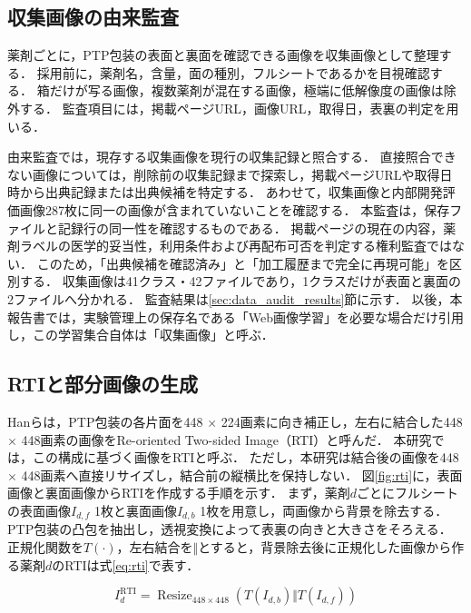 \documentclass[uplatex,dvipdfmx]{jsarticle}
\begin{document}
\subsection{収集画像の由来監査}\label{sec:provenance_audit}

薬剤ごとに，PTP包装の表面と裏面を確認できる画像を収集画像として整理する．
採用前に，薬剤名，含量，面の種別，フルシートであるかを目視確認する．
箱だけが写る画像，複数薬剤が混在する画像，極端に低解像度の画像は除外する．
監査項目には，掲載ページURL，画像URL，取得日，表裏の判定を用いる．

由来監査では，現存する収集画像を現行の収集記録と照合する．
直接照合できない画像については，削除前の収集記録まで探索し，掲載ページURLや取得日時から出典記録または出典候補を特定する．
あわせて，収集画像と内部開発評価画像287枚に同一の画像が含まれていないことを確認する．
本監査は，保存ファイルと記録行の同一性を確認するものである．
掲載ページの現在の内容，薬剤ラベルの医学的妥当性，利用条件および再配布可否を判定する権利監査ではない．
このため，「出典候補を確認済み」と「加工履歴まで完全に再現可能」を区別する．
収集画像は41クラス・42ファイルであり，1クラスだけが表面と裏面の2ファイルへ分かれる．
監査結果は\ref{sec:data_audit_results}節に示す．
以後，本報告書では，実験管理上の保存名である「Web画像学習」を必要な場合だけ引用し，この学習集合自体は「収集画像」と呼ぶ．

\subsection{RTIと部分画像の生成}

Hanらは，PTP包装の各片面を448 $\times$ 224画素に向き補正し，左右に結合した448 $\times$ 448画素の画像をRe-oriented Two-sided Image（RTI）と呼んだ\cite{han2021blister}．
本研究では，この構成に基づく画像をRTIと呼ぶ．
ただし，本研究は結合後の画像を448 $\times$ 448画素へ直接リサイズし，結合前の縦横比を保持しない．
図\ref{fig:rti}に，表面画像と裏面画像からRTIを作成する手順を示す．
まず，薬剤$d$ごとにフルシートの表面画像$I_{d,f}$ 1枚と裏面画像$I_{d,b}$ 1枚を用意し，両画像から背景を除去する．
PTP包装の凸包を抽出し，透視変換によって表裏の向きと大きさをそろえる．
正規化関数を$T(\cdot)$，左右結合を$\Vert$とすると，背景除去後に正規化した画像から作る薬剤$d$のRTIは式\eqref{eq:rti}で表す．

\begin{equation}
  I^{\mathrm{RTI}}_d =
  \operatorname{Resize}_{448 \times 448}
  \left(T(I_{d,b}) \Vert T(I_{d,f})\right)
  \label{eq:rti}
\end{equation}
\end{document}
